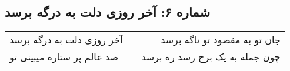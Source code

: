 \begin{center}
\section*{شماره ۶: آخر روزی دلت به درگه برسد}
\label{sec:006}
\begin{longtable}{l p{0.5cm} r}
آخر روزی دلت به درگه برسد
&&
جان تو به مقصود تو ناگه برسد
\\
صد عالم پر ستاره میبینی تو
&&
چون جمله به یک برج رسد ره برسد
\\
\end{longtable}
\end{center}

